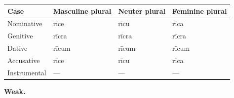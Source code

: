 \par\begingroup
\fontsize{10.5}{13.2}\selectfont
\par\begin{minipage}{\linewidth}\raggedright
\setlength{\LTleft}{0pt}\setlength{\LTright}{\fill}
\noindent
\begin{tabular}{@{}>{\raggedright\arraybackslash}p{22mm}>{\raggedright\arraybackslash}p{31.18mm}>{\raggedright\arraybackslash}p{31.18mm}>{\raggedright\arraybackslash}p{31.18mm}@{}}
\toprule
\textbf{Case} & \textbf{Masculine plural} & \textbf{Neuter plural} & \textbf{Feminine plural} \\
\midrule
Nominative & rīce & rīcu & rīca \\
Genitive & rīcra & rīcra & rīcra \\
Dative & rīcum & rīcum & rīcum \\
Accusative & rīce & rīcu & rīca \\
Instrumental & — & — & — \\
\bottomrule
\end{tabular}
\end{minipage}\par
\par\endgroup
\par\addvspace{5pt}

\textbf{Weak.}

